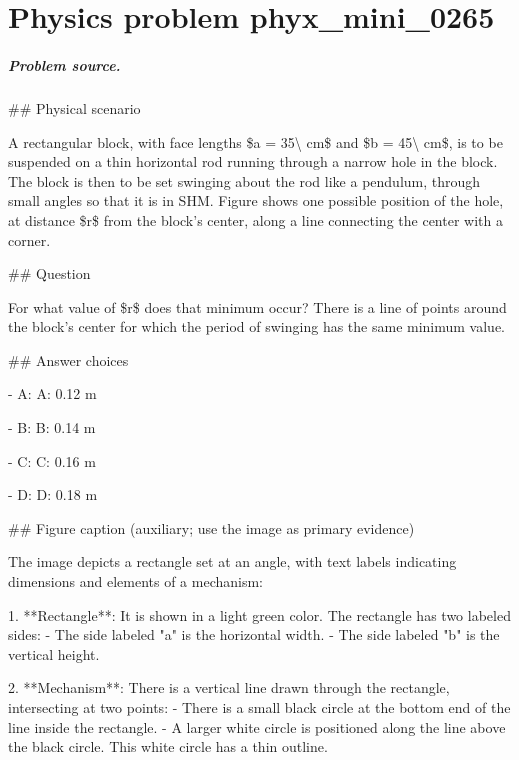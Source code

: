 
\chapter{Physics problem phyx\_mini\_0265}
\label{ch:PhyXMiniProblems_problem_phyx_mini_0265}

\paragraph{Problem source.}
\#\# Physical scenario

A rectangular block, with face lengths \$a = 35\textbackslash{} cm\$ and \$b = 45\textbackslash{} cm\$, is to be suspended on a thin horizontal rod running through a narrow hole in the block. The block is then to be set swinging about the rod like a pendulum, through small angles so that it is in SHM. Figure shows one possible position of the hole, at distance \$r\$ from the block's center, along a line connecting the center with a corner.

\#\# Question

For what value of \$r\$ does that minimum occur? There is a line of points around the block's center for which the period of swinging has the same minimum value.

\#\# Answer choices

- A: A: 0.12 m

- B: B: 0.14 m

- C: C: 0.16 m

- D: D: 0.18 m

\#\# Figure caption (auxiliary; use the image as primary evidence)

The image depicts a rectangle set at an angle, with text labels indicating dimensions and elements of a mechanism:

1. **Rectangle**: It is shown in a light green color. The rectangle has two labeled sides:
   - The side labeled "a" is the horizontal width.
   - The side labeled "b" is the vertical height.

2. **Mechanism**: There is a vertical line drawn through the rectangle, intersecting at two points:
   - There is a small black circle at the bottom end of the line inside the rectangle.
   - A larger white circle is positioned along the line above the black circle. This white circle has a thin outline.

